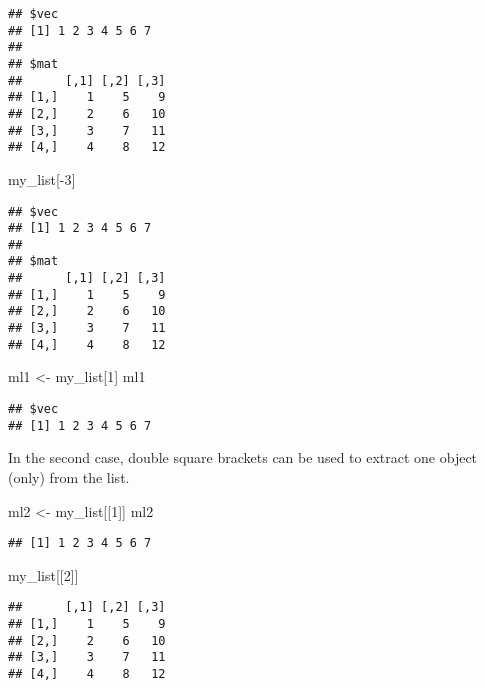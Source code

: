 \documentclass[]{book}
\newenvironment{Shaded}{\begin{snugshade}}{\end{snugshade}}
\newcommand{\DecValTok}[1]{\textcolor[rgb]{0.00,0.00,0.81}{{#1}}}
\newcommand{\StringTok}[1]{\textcolor[rgb]{0.31,0.60,0.02}{{#1}}}
\newcommand{\NormalTok}[1]{{#1}}
\begin{document}
\begin{verbatim}
## $vec
## [1] 1 2 3 4 5 6 7
## 
## $mat
##      [,1] [,2] [,3]
## [1,]    1    5    9
## [2,]    2    6   10
## [3,]    3    7   11
## [4,]    4    8   12
\end{verbatim}

\begin{Shaded}
\begin{Highlighting}[]
\NormalTok{my_list[-}\DecValTok{3}\NormalTok{]}
\end{Highlighting}
\end{Shaded}

\begin{verbatim}
## $vec
## [1] 1 2 3 4 5 6 7
## 
## $mat
##      [,1] [,2] [,3]
## [1,]    1    5    9
## [2,]    2    6   10
## [3,]    3    7   11
## [4,]    4    8   12
\end{verbatim}

\begin{Shaded}
\begin{Highlighting}[]
\NormalTok{ml1 <-}\StringTok{ }\NormalTok{my_list[}\DecValTok{1}\NormalTok{]}
\NormalTok{ml1}
\end{Highlighting}
\end{Shaded}

\begin{verbatim}
## $vec
## [1] 1 2 3 4 5 6 7
\end{verbatim}

In the second case, double square brackets can be used to extract one
object (only) from the list.

\begin{Shaded}
\begin{Highlighting}[]
\NormalTok{ml2 <-}\StringTok{ }\NormalTok{my_list[[}\DecValTok{1}\NormalTok{]]}
\NormalTok{ml2}
\end{Highlighting}
\end{Shaded}

\begin{verbatim}
## [1] 1 2 3 4 5 6 7
\end{verbatim}

\begin{Shaded}
\begin{Highlighting}[]
\NormalTok{my_list[[}\DecValTok{2}\NormalTok{]]}
\end{Highlighting}
\end{Shaded}

\begin{verbatim}
##      [,1] [,2] [,3]
## [1,]    1    5    9
## [2,]    2    6   10
## [3,]    3    7   11
## [4,]    4    8   12
\end{verbatim}
\end{document}
